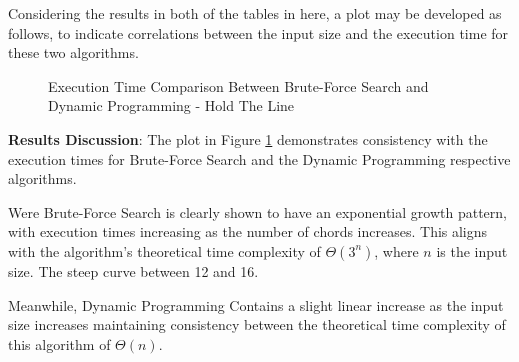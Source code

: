 \documentclass[conference]{IEEEtran}
\begin{document}
Considering the results in both of the tables in here, a plot may be developed as follows, to indicate correlations between the input size and the execution time for these two algorithms.

\begin{figure}[H]
    \centering
    \caption{Execution Time Comparison Between Brute-Force Search and Dynamic Programming - Hold The Line}
    \label{fig:execution-time}
\end{figure}

\textbf{Results Discussion}: The plot in Figure \ref{fig:execution-time} demonstrates consistency with the execution times for Brute-Force Search and the Dynamic Programming respective algorithms. 

Were Brute-Force Search is clearly shown to have an exponential growth pattern, with execution times increasing as the number of chords increases. This aligns with the algorithm's theoretical time complexity of $\Theta(3^{n})$, where $n$ is the input size. The steep curve between 12 and 16.

Meanwhile, Dynamic Programming Contains a slight linear increase as the input size increases maintaining consistency between the theoretical time complexity of this algorithm of $\Theta(n)$. 
\end{document}

